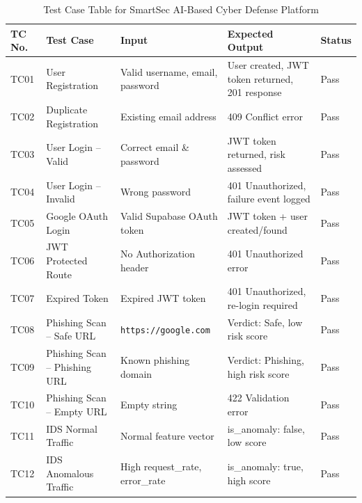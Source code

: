 \begin{table}[h]
\centering
\caption{Test Case Table for SmartSec AI-Based Cyber Defense Platform}
\label{tab:testcases}
\begin{tabular}{|p{1cm}|p{3.5cm}|p{3.5cm}|p{4cm}|p{1.5cm}|}
\hline
\textbf{TC No.} & \textbf{Test Case} & \textbf{Input} & \textbf{Expected Output} & \textbf{Status} \\
\hline

TC01 & User Registration & Valid username, email, password & User created, JWT token returned, 201 response & Pass \\
\hline

TC02 & Duplicate Registration & Existing email address & 409 Conflict error & Pass \\
\hline

TC03 & User Login -- Valid & Correct email \& password & JWT token returned, risk assessed & Pass \\
\hline

TC04 & User Login -- Invalid & Wrong password & 401 Unauthorized, failure event logged & Pass \\
\hline

TC05 & Google OAuth Login & Valid Supabase OAuth token & JWT token + user created/found & Pass \\
\hline

TC06 & JWT Protected Route & No Authorization header & 401 Unauthorized error & Pass \\
\hline

TC07 & Expired Token & Expired JWT token & 401 Unauthorized, re-login required & Pass \\
\hline

TC08 & Phishing Scan -- Safe URL & \texttt{https://google.com} & Verdict: Safe, low risk score & Pass \\
\hline

TC09 & Phishing Scan -- Phishing URL & Known phishing domain & Verdict: Phishing, high risk score & Pass \\
\hline

TC10 & Phishing Scan -- Empty URL & Empty string & 422 Validation error & Pass \\
\hline

TC11 & IDS Normal Traffic & Normal feature vector & is\_anomaly: false, low score & Pass \\
\hline

TC12 & IDS Anomalous Traffic & High request\_rate, error\_rate & is\_anomaly: true, high score & Pass \\
\hline


\end{tabular}
\end{table}
